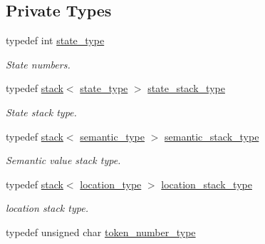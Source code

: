 \subsection*{Private Types}
\begin{DoxyCompactItemize}
\item 
\hypertarget{classyy_1_1CParser_a29e7ee85964141e46dd6d9c39653a87e}{typedef int \hyperlink{classyy_1_1CParser_a29e7ee85964141e46dd6d9c39653a87e}{state\-\_\-type}}\label{classyy_1_1CParser_a29e7ee85964141e46dd6d9c39653a87e}

\begin{DoxyCompactList}\small\item\em State numbers. \end{DoxyCompactList}\item 
\hypertarget{classyy_1_1CParser_aba46c1145be36b531f0765b49ae812e8}{typedef \hyperlink{classyy_1_1stack}{stack}$<$ \hyperlink{classyy_1_1CParser_a29e7ee85964141e46dd6d9c39653a87e}{state\-\_\-type} $>$ \hyperlink{classyy_1_1CParser_aba46c1145be36b531f0765b49ae812e8}{state\-\_\-stack\-\_\-type}}\label{classyy_1_1CParser_aba46c1145be36b531f0765b49ae812e8}

\begin{DoxyCompactList}\small\item\em State stack type. \end{DoxyCompactList}\item 
\hypertarget{classyy_1_1CParser_af0ed7ecea92b2c850e0d79973ea2e6a6}{typedef \hyperlink{classyy_1_1stack}{stack}$<$ \hyperlink{unionyy_1_1CParser_1_1semantic__type}{semantic\-\_\-type} $>$ \hyperlink{classyy_1_1CParser_af0ed7ecea92b2c850e0d79973ea2e6a6}{semantic\-\_\-stack\-\_\-type}}\label{classyy_1_1CParser_af0ed7ecea92b2c850e0d79973ea2e6a6}

\begin{DoxyCompactList}\small\item\em Semantic value stack type. \end{DoxyCompactList}\item 
\hypertarget{classyy_1_1CParser_af7f925a684c7810b103c4339bb6be028}{typedef \hyperlink{classyy_1_1stack}{stack}$<$ \hyperlink{classyy_1_1CParser_a674649435d1e3521d1e820a5139f7232}{location\-\_\-type} $>$ \hyperlink{classyy_1_1CParser_af7f925a684c7810b103c4339bb6be028}{location\-\_\-stack\-\_\-type}}\label{classyy_1_1CParser_af7f925a684c7810b103c4339bb6be028}

\begin{DoxyCompactList}\small\item\em location stack type. \end{DoxyCompactList}\item 
\hypertarget{classyy_1_1CParser_afae3a386da0f1b35f4dad928f53782f6}{typedef unsigned char \hyperlink{classyy_1_1CParser_afae3a386da0f1b35f4dad928f53782f6}{token\-\_\-number\-\_\-type}}\label{classyy_1_1CParser_afae3a386da0f1b35f4dad928f53782f6}


\end{DoxyCompactItemize}
